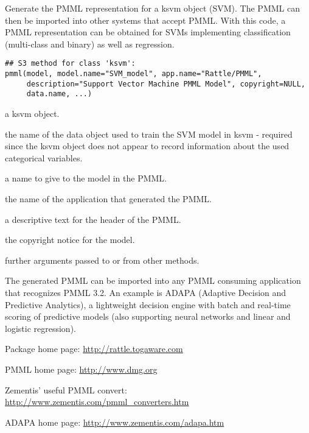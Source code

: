 \begin{Description}\relax
Generate the PMML representation for a ksvm object (SVM). The PMML can
then be imported into other systems that accept PMML.  With this code,
a PMML representation can be obtained for SVMs implementing
classification (multi-class and binary) as well as regression.
\end{Description}
\begin{Usage}
\begin{verbatim}
## S3 method for class 'ksvm':
pmml(model, model.name="SVM_model", app.name="Rattle/PMML",
     description="Support Vector Machine PMML Model", copyright=NULL,
     data.name, ...)
\end{verbatim}
\end{Usage}
\begin{Arguments}
\begin{ldescription}
\item[\code{model}] a ksvm object.
\item[\code{data.name}] the name of the data object used to train the SVM
model in ksvm - required since the ksvm object does not appear to
record information about the used categorical variables.
\item[\code{model.name}] a name to give to the model in the PMML.
\item[\code{app.name}] the name of the application that generated the PMML.
\item[\code{description}] a descriptive text for the header of the PMML.
\item[\code{copyright}] the copyright notice for the model.
\item[\code{...}] further arguments passed to or from other methods.
\end{ldescription}
\end{Arguments}
\begin{Details}\relax
The generated PMML can be imported into any PMML consuming application
that recognizes PMML 3.2. An example is ADAPA (Adaptive Decision and
Predictive Analytics), a lightweight decision engine with batch and
real-time scoring of predictive models (also supporting neural
networks and linear and logistic regression).
\end{Details}
\begin{Author}\relax
{}
\end{Author}
\begin{References}\relax
Package home page: \url{http://rattle.togaware.com}

PMML home page: \url{http://www.dmg.org}

Zementis' useful PMML convert: \url{http://www.zementis.com/pmml_converters.htm}

ADAPA home page: \url{http://www.zementis.com/adapa.htm}
\end{References}
